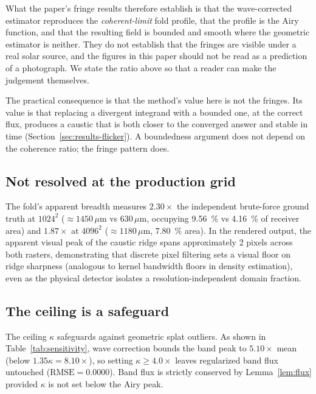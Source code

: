 What the paper's fringe results therefore establish is that the wave-corrected
estimator reproduces the \emph{coherent-limit} fold profile, that the profile is
the Airy function, and that the resulting field is bounded and smooth where the
geometric estimator is neither. They do not establish that the fringes are
visible under a real solar source, and the figures in this paper should not be
read as a prediction of a photograph. We state the ratio above so that a reader can make the judgement themselves.

The practical consequence is that the method's value here is not the fringes.
Its value is that replacing a divergent integrand with a bounded one, at the correct
flux, produces a caustic that is both closer to the converged answer and stable
in time (Section~\ref{sec:results-flicker}). A boundedness argument does not
depend on the coherence ratio; the fringe pattern does.

\subsection{Not resolved at the production grid}
\label{sec:limits-resolution}

The fold's apparent breadth measures $2.30\times$ the independent brute-force ground truth
at $1024^2$ ($\approx 1450\,\mu\text{m}$ vs $630\,\mu\text{m}$, occupying \SI{9.56}{\percent} vs \SI{4.16}{\percent} of receiver area)
and $1.87\times$ at $4096^2$ ($\approx 1180\,\mu\text{m}$, \SI{7.80}{\percent} area).
In the rendered output, the apparent visual peak of the caustic ridge spans approximately 2 pixels across both rasters, demonstrating that discrete pixel filtering sets a visual floor on ridge sharpness (analogous to kernel bandwidth floors in density estimation), even as the physical detector isolates a resolution-independent domain fraction.

\subsection{The ceiling is a safeguard}
\label{sec:limits-ceiling}

The ceiling $\kappa$ safeguards against geometric splat outliers. As shown in Table~\ref{tab:sensitivity}, wave correction bounds the band peak to $5.10\times$ mean (below $1.35\kappa = 8.10\times$), so setting $\kappa \ge 4.0\times$ leaves regularized band flux untouched ($\text{RMSE} = 0.0000$). Band flux is strictly conserved by Lemma~\ref{lem:flux} provided $\kappa$ is not set below the Airy peak.


